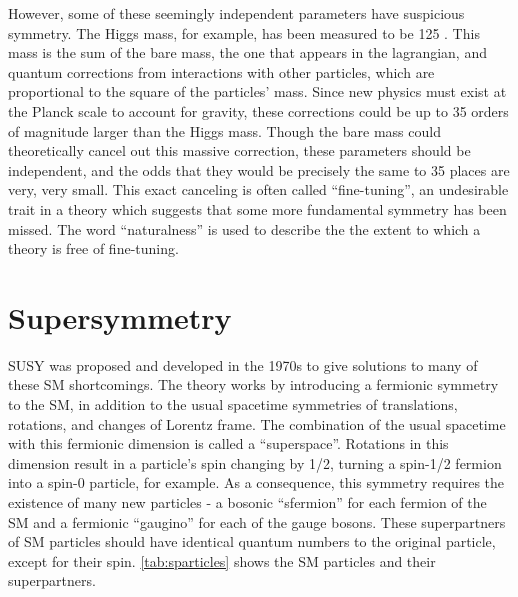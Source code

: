 However, some of these seemingly independent parameters have suspicious symmetry. The Higgs mass, for example, has been measured to be 125 \gev. This mass is the sum of the bare mass, the one that appears in the lagrangian, and quantum corrections from interactions with other particles, which are proportional to the square of the particles' mass. Since new physics must exist at the Planck scale to account for gravity, these corrections could be up to 35 orders of magnitude larger than the Higgs mass. Though the bare mass could theoretically cancel out this massive correction, these parameters should be independent, and the odds that they would be precisely the same to 35 places are very, very small. This exact canceling is often called ``fine-tuning'', an undesirable trait in a theory which suggests that some more fundamental symmetry has been missed. The word ``naturalness'' is used to describe the the extent to which a theory is free of fine-tuning. 


\section{Supersymmetry}

\ac{SUSY} was proposed and developed in the 1970s to give solutions to many of these \ac{SM} shortcomings. The theory works by introducing a fermionic symmetry to the \ac{SM}, in addition to the usual spacetime symmetries of translations, rotations, and changes of Lorentz frame. The combination of the usual spacetime with this fermionic dimension is called a ``superspace''. Rotations in this dimension result in a particle's spin changing by 1/2, turning a spin-1/2 fermion into a spin-0 particle, for example. As a consequence, this symmetry requires the existence of many new particles - a bosonic ``sfermion'' for each fermion of the \ac{SM} and a fermionic ``gaugino'' for each of the gauge bosons. These superpartners of \ac{SM} particles should have identical quantum numbers to the original particle, except for their spin. \autoref{tab:sparticles} shows the \ac{SM} particles and their superpartners. 


